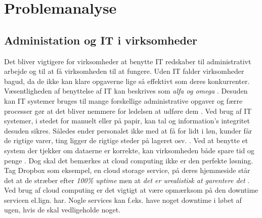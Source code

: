\chapter{Problemanalyse}\label{ch:analyse}

\section{Administation og IT i virksomheder}

Det bliver vigtigere for virksomheder at benytte IT redskaber til administrativt arbejde og til at få virksomheden til at fungere. Uden IT falder virksomheder bagud, da de ikke kan klare opgaverne lige så effektivt som deres konkurrenter. Væsentligheden af benyttelse af IT kan beskrives som \textit{alfa og omega} \citep{case_green_team}. Desuden kan IT systemer bruges til mange forskellige administrative opgaver og færre processer gør at det bliver nemmere for ledelsen at udføre dem \citep{Ibiz_streamline}. Ved brug af IT systemer, i stedet for manuelt eller på papir, kan tal og information's integritet desuden sikres. Således ender personalet ikke med at få for lidt i løn, kunder får de rigtige varer, ting ligger de rigtige steder på lageret osv. \citep{Ibiz_streamline}. Ved at benytte et system der tjekker om dataerne er korrekte, kan virksomheden både spare tid og penge \citep{case_green_team}. Dog skal det bemærkes at cloud computing ikke er den perfekte løsning. Tag Dropbox som eksempel, en cloud storage service, på deres hjemmeside står det at de stræber efter \textit{100\% uptime} men at \textit{det er urealistisk at garentere det} \citep{drpbx_downtime}. Ved brug af cloud computing er det vigtigt at være opmærksom på den downtime servicen el.lign. har. Nogle services kan f.eks. have noget downtime i løbet af ugen, hvis de skal vedligeholde noget. 


